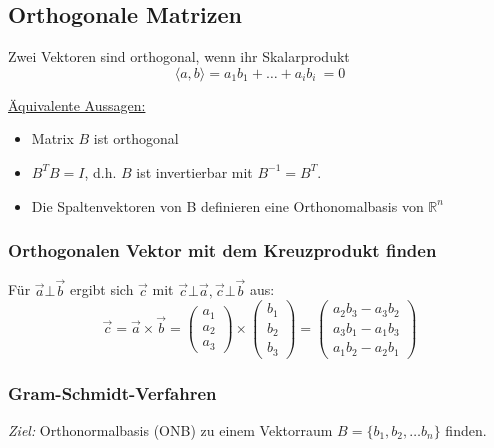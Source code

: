 \subsection{Orthogonale Matrizen}

Zwei Vektoren sind orthogonal, wenn ihr Skalarprodukt\\ 
\begin{equation*}
    \langle a, b \rangle = a_1 b_1 + \hdots + a_i b_i\ = 0
\end{equation*}

\underline{Äquivalente Aussagen:}
\begin{itemize}
    \item Matrix \(B\) ist orthogonal
    \item \(B^T B = I\), d.h. \(B\) ist invertierbar mit \(B^{-1}=B^T\).
    \item Die Spaltenvektoren von B definieren eine Orthonomalbasis von \(\mathbb{R}^n\)\\
\end{itemize}

\subsubsection{Orthogonalen Vektor mit dem Kreuzprodukt finden}
Für \(\vec{a} \bot \vec{b}\) ergibt sich \(\vec{c}\) mit \(\vec{c} \bot \vec{a}, \vec{c} \bot \vec{b}\) aus:
\begin{equation}
    \vec{c} = 
    \vec{a} \times \vec{b} = \begin{pmatrix}
        a_1 \\
        a_2 \\
        a_3
    \end{pmatrix} \times
    \begin{pmatrix}
        b_1 \\
        b_2 \\
        b_3
    \end{pmatrix} =
    \begin{pmatrix}
        a_2 b_3 - a_3 b_2 \\
        a_3 b_1 - a_1 b_3 \\
        a_1 b_2 - a_2 b_1
    \end{pmatrix}
\end{equation}

\subsubsection{Gram-Schmidt-Verfahren}
\textit{Ziel:} Orthonormalbasis (ONB) zu einem Vektorraum \(B=\{b_1, b_2, \hdots b_n\}\) finden.\\

